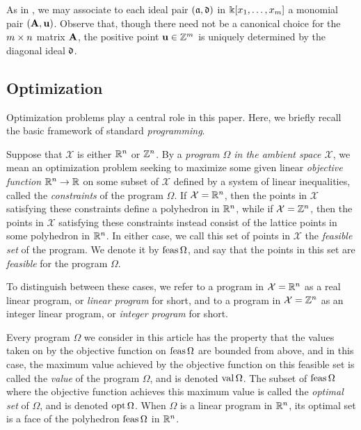 \documentclass{amsart}
\begin{document}
\begin{remark}
\label{associate of pairs: R}
 As in , we may associate to each ideal pair $(\mathfrak{a}, \mathfrak{d})$ in $\Bbbk[x_1, \ldots, x_{m}]$ a monomial pair $(\mathbf{A}, \mathbf{u})$.  Observe that, though there need not be a canonical choice for the $m \times n$ matrix $\mathbf{A}$, the positive point $\mathbf{u} \in \mathbb{Z}^m$ is uniquely determined by the diagonal ideal $\mathfrak{d}$.
\end{remark}

\subsection{Optimization} \label{optimization: S}  Optimization problems play a central role in this paper.  Here, we briefly recall the basic framework of standard \emph{programming}.

Suppose that $\mathcal{X}$ is either $\mathbb{R}^n$ or $\mathbb{Z}^n$.  By a \emph{program $\Omega$ in the ambient space $\mathcal{X}$}, we mean an optimization problem seeking to maximize some given linear \emph{objective function} $\mathbb{R}^n \to \mathbb{R}$ on some subset of $\mathcal{X}$ defined by a system of linear inequalities, called the \emph{constraints} of the program $\Omega$. If $\mathcal{X} = \mathbb{R}^n$, then the points in $\mathcal{X}$ satisfying these constraints define a polyhedron in $\mathbb{R}^n$, while if $\mathcal{X} = \mathbb{Z}^n$, then the points in $\mathcal{X}$ satisfying these constraints instead consist of the lattice points in some polyhedron in $\mathbb{R}^n$.  In either case, we call this set of points in $\mathcal{X}$ the \emph{feasible set} of the program.  We denote it by $\operatorname{feas} \Omega$, and say that the points in this set are \emph{feasible} for the program $\Omega$.

To distinguish between these cases, we refer to a program in $\mathcal{X} = \mathbb{R}^n$ as a {real linear program}, or \emph{linear program} for short, and to a program in $\mathcal{X}=\mathbb{Z}^n$ as an {integer linear program}, or \emph{integer program} for short.

Every program $\Omega$ we consider in this article has the property that the values taken on by the objective function on $\operatorname{feas} \Omega$ are bounded from above, and in this case, the maximum value achieved by the objective function on this feasible set is called the \emph{value} of the program $\Omega$, and is denoted $\operatorname{val} \Omega$.  The subset of $\operatorname{feas} \Omega$ where the objective function achieves this maximum value is called the \emph{optimal set} of $\Omega$, and is denoted $\operatorname{opt} \Omega$.   When $\Omega$ is a linear program in $\mathbb{R}^n$, its optimal set is a face of the polyhedron $\operatorname{feas} \Omega$ in $\mathbb{R}^n$.
\end{document}
